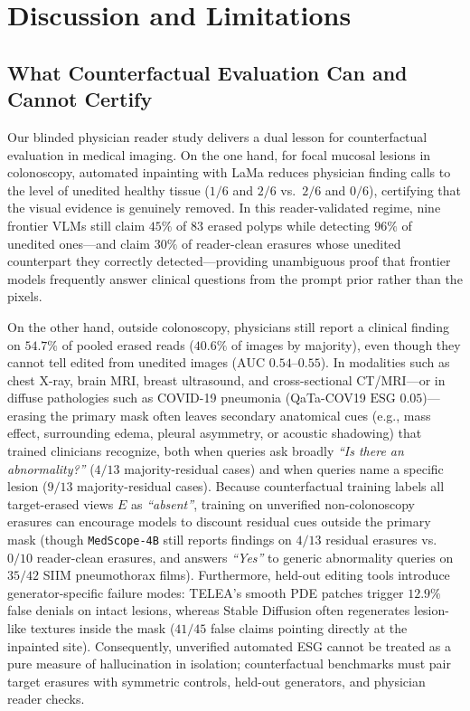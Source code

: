 \documentclass{article} %
\begin{document}
\section{Discussion and Limitations}
\label{sec:discussion}

\subsection{What Counterfactual Evaluation Can and Cannot Certify}
\label{subsec:disc_certify}
Our blinded physician reader study delivers a dual lesson for counterfactual evaluation in medical imaging. On the one hand, for focal mucosal lesions in colonoscopy, automated inpainting with LaMa reduces physician finding calls to the level of unedited healthy tissue ($1/6$ and $2/6$ vs.\ $2/6$ and $0/6$), certifying that the visual evidence is genuinely removed. In this reader-validated regime, nine frontier VLMs still claim $45\%$ of $83$ erased polyps while detecting $96\%$ of unedited ones---and claim $30\%$ of reader-clean erasures whose unedited counterpart they correctly detected---providing unambiguous proof that frontier models frequently answer clinical questions from the prompt prior rather than the pixels.

On the other hand, outside colonoscopy, physicians still report a clinical finding on $54.7\%$ of pooled erased reads ($40.6\%$ of images by majority), even though they cannot tell edited from unedited images ($\text{AUC } 0.54\text{--}0.55$). In modalities such as chest X-ray, brain MRI, breast ultrasound, and cross-sectional CT/MRI---or in diffuse pathologies such as COVID-19 pneumonia (QaTa-COV19 $\text{ESG } 0.05$)---erasing the primary mask often leaves secondary anatomical cues (e.g., mass effect, surrounding edema, pleural asymmetry, or acoustic shadowing) that trained clinicians recognize, both when queries ask broadly \emph{``Is there an abnormality?''} ($4/13$ majority-residual cases) and when queries name a specific lesion ($9/13$ majority-residual cases). Because counterfactual training labels all target-erased views $E$ as \emph{``absent''}, training on unverified non-colonoscopy erasures can encourage models to discount residual cues outside the primary mask (though \texttt{MedScope-4B} still reports findings on $4/13$ residual erasures vs.\ $0/10$ reader-clean erasures, and answers \emph{``Yes''} to generic abnormality queries on $35/42$ SIIM pneumothorax films). Furthermore, held-out editing tools introduce generator-specific failure modes: TELEA's smooth PDE patches trigger $12.9\%$ false denials on intact lesions, whereas Stable Diffusion often regenerates lesion-like textures inside the mask ($41/45$ false claims pointing directly at the inpainted site). Consequently, unverified automated ESG cannot be treated as a pure measure of hallucination in isolation; counterfactual benchmarks must pair target erasures with symmetric controls, held-out generators, and physician reader checks.
\end{document}
